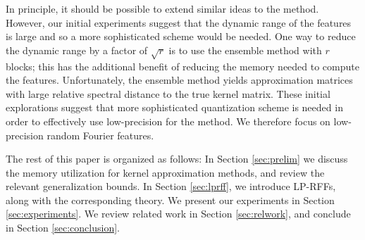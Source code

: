 In principle, it should be possible to extend similar ideas to the \Nystrom method. However, our initial experiments suggest that the dynamic range of the \Nystrom features is large and so a more sophisticated scheme would be needed. One way to reduce the dynamic range by a factor of $\sqrt{r}$ is to use the ensemble \Nystrom method \citep{ensemble09} with $r$ blocks; this has the additional benefit of reducing the memory needed to compute the features. Unfortunately, the ensemble method yields approximation matrices with large relative spectral distance to the true kernel matrix. These initial explorations suggest that more sophisticated quantization scheme is needed in order to effectively use low-precision for the \Nystrom method. We therefore focus on low-precision random Fourier features.



The rest of this paper is organized as follows: In Section \ref{sec:prelim} we discuss the memory utilization for kernel approximation methods, and review the relevant generalization bounds.  In Section \ref{sec:lprff}, we introduce LP-RFFs, along with the corresponding theory. We present our experiments in Section \ref{sec:experiments}.  We review related work in Section \ref{sec:relwork}, and conclude in Section \ref{sec:conclusion}.
